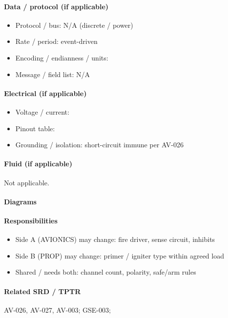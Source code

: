 \paragraph{Data / protocol (if applicable)}
\begin{itemize}
  \item Protocol / bus: N/A (discrete / power)
  \item Rate / period: event-driven
  \item Encoding / endianness / units: \todo{}
  \item Message / field list: N/A
\end{itemize}

\paragraph{Electrical (if applicable)}
\begin{itemize}
  \item Voltage / current: 
  \item Pinout table: \todo{}
  \item Grounding / isolation: short-circuit immune per AV-026
\end{itemize}

\paragraph{Fluid (if applicable)}
Not applicable.

\paragraph{Diagrams}

\paragraph{Responsibilities}
\begin{itemize}
  \item Side A (AVIONICS) may change: fire driver, sense circuit, inhibits
  \item Side B (PROP) may change: primer / igniter type within agreed load
  \item Shared / needs both: channel count, polarity, safe/arm rules
\end{itemize}

\paragraph{Related SRD / TPTR}
AV-026, AV-027, AV-003; GSE-003; 

